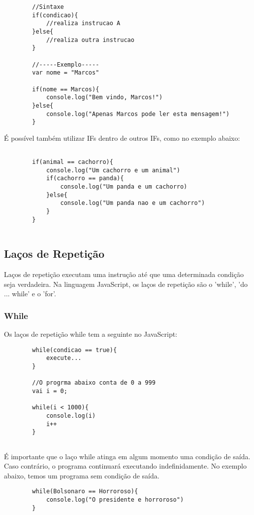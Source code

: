 	\begin{lstlisting}
		//Sintaxe
		if(condicao){
			//realiza instrucao A
		}else{
			//realiza outra instrucao
		}
		
		//-----Exemplo-----
		var nome = "Marcos"
		
		if(nome == Marcos){
			console.log("Bem vindo, Marcos!")
		}else{
			console.log("Apenas Marcos pode ler esta mensagem!")
		}
	\end{lstlisting}
	
	É possível também utilizar IFs dentro de outros IFs, como no exemplo abaixo:
	
	\begin{lstlisting}
	
		if(animal == cachorro){
			console.log("Um cachorro e um animal")
			if(cachorro == panda){
				console.log("Um panda e um cachorro)
			}else{
				console.log("Um panda nao e um cachorro")
			}
		}
		
	\end{lstlisting}
	
	\subsection{Laços de Repetição}
	Laços de repetição executam uma instrução até que uma determinada condição seja verdadeira. Na linguagem JavaScript, os laços de repetição são o 'while', 'do ... while' e o 'for'.
	\newline
	\newline
	
	\subsubsection{While}
	Os laços de repetição while tem a seguinte no JavaScript:
	
	\begin{lstlisting}
		while(condicao == true){
			execute...
		}
		
		//O progrma abaixo conta de 0 a 999
		vai i = 0;
		
		while(i < 1000){
			console.log(i)
			i++
		}
		
	\end{lstlisting}
	É importante que o laço while atinga em algum momento uma condição de saída. Caso contrário, o programa continuará executando indefinidamente. No exemplo abaixo, temos um programa sem condição de saída.
	
	\begin{lstlisting}
		while(Bolsonaro == Horroroso){
			console.log("O presidente e horroroso")
		}
	\end{lstlisting}
	
